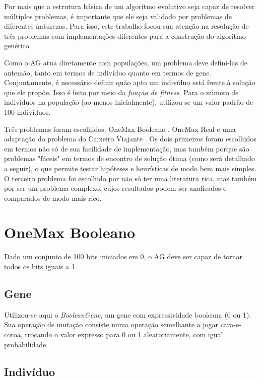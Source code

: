 \label{2_problemas}

Por mais que a estrutura básica de um algoritmo evolutivo seja capaz de resolver múltiplos problemas, é importante que ele seja validado por problemas de diferentes naturezas. Para isso, este trabalho focou sua atenção na resolução de três problemas com implementações diferentes para a construção do algoritmo genético.

Como o AG atua diretamente com populações, um problema deve defini-las de antemão, tanto em termos de indivíduo quanto em termos de gene. Conjuntamente, é necessário definir quão apto um indivíduo está frente à solução que ele propõe. Isso é feito por meio da \emph{função de fitness}. Para o número de indivíduos na população (ao menos inicialmente), utilizou-se um valor padrão de 100 indivíduos.

Três problemas foram escolhidos: OneMax Booleano \cite{giguere1998population}, OneMax Real e uma adaptação do problema do Caixeiro Viajante \cite{applegate2011traveling}. Os dois primeiros foram escolhidos em termos não só de sua facilidade de implementação, mas também porque são problemas "fáceis" em termos de encontro de solução ótima (como será detalhado a seguir), o que permite testar hipóteses e heurísticas de modo bem mais simples. O terceiro problema foi escolhido por não só ter uma literatura rica, mas também por ser um problema complexo, cujos resultados podem ser analisados e comparados de modo mais rico.

\section{OneMax Booleano}

Dado um conjunto de 100 bits iniciados em 0, o AG deve ser capaz de tornar todos os bits iguais a 1.

\subsection*{Gene}

Utilizou-se aqui o \emph{BooleanGene}, um gene com expressividade booleana (0 ou 1). Sua operação de mutação consiste numa operação semelhante a jogar cara-e-coroa, trocando o valor expresso para 0 ou 1 aleatoriamente, com igual probabilidade.

\subsection*{Indivíduo}

